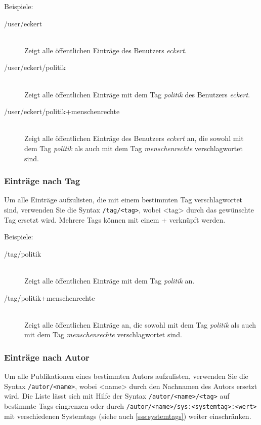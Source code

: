 Beispiele:
\begin{description}
    \item [/user/eckert] \hfill \\ 
    Zeigt alle öffentlichen Einträge des Benutzers \textit{eckert}.
    \item [/user/eckert/politik] \hfill \\
    Zeigt alle öffentlichen Einträge mit dem Tag \textit{politik} des Benutzers \textit{eckert}.
    \item [/user/eckert/politik+menschenrechte] \hfill \\
    Zeigt alle öffentlichen Einträge des Benutzers \textit {eckert} an, die sowohl mit dem Tag \textit{politik} als auch mit dem Tag \textit{menschenrechte} verschlagwortet sind.
\end{description}

\subsubsection{Einträge nach Tag}
\label{sss:nachTag}
Um alle Einträge aufzulisten, die mit einem bestimmten Tag verschlagwortet sind, verwenden Sie die Syntax \texttt{/tag/<tag>}, wobei <tag> durch das gewünschte Tag ersetzt wird. Mehrere Tags können mit einem + verknüpft werden.

Beispiele:
\begin{description}
    \item [/tag/politik] \hfill \\
    Zeigt alle öffentlichen Einträge mit dem Tag \textit{politik} an.
    \item [/tag/politik+menschenrechte] \hfill \\
    Zeigt alle öffentlichen Einträge an, die sowohl mit dem Tag \textit{politik} als auch mit dem Tag \textit{menschenrechte} verschlagwortet sind.
\end{description}

\subsubsection{Einträge nach Autor}
\label{sss:nachAutor}

Um alle Publikationen eines bestimmten Autors aufzulisten, verwenden Sie die Syntax \texttt{/autor/<name>}, wobei <name> durch den Nachnamen des Autors ersetzt wird. Die Liste lässt sich mit Hilfe der Syntax \texttt{/autor/<name>/<tag>} auf bestimmte Tags eingrenzen oder durch \texttt{/autor/<name>/sys:<systemtag>:<wert>} mit verschiedenen Systemtags (siehe auch \autoref{sss:systemtags}) weiter einschränken.


